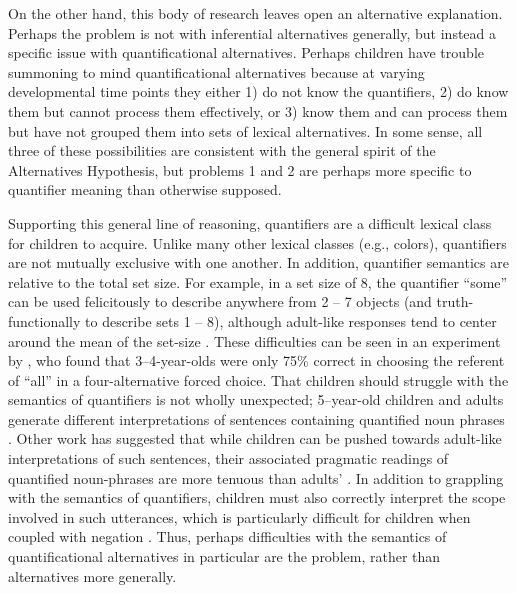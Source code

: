 \documentclass[man]{apa2}
\begin{document}
On the other hand, this body of research leaves open an alternative explanation. Perhaps the problem is not with inferential alternatives generally, but instead a specific issue with quantificational alternatives. Perhaps children have trouble summoning to mind quantificational alternatives because at varying developmental time points they either 1) do not know the quantifiers, 2) do know them but cannot process them effectively, or 3) know them and can process them but have not grouped them into sets of lexical alternatives. In some sense, all three of these possibilities are consistent with the general spirit of the Alternatives Hypothesis, but problems 1 and 2 are perhaps more specific to quantifier meaning than otherwise supposed. 

Supporting this general line of reasoning, quantifiers are a difficult lexical class for children to acquire. Unlike many other lexical classes (e.g., colors), quantifiers are not mutually exclusive with one another. In addition, quantifier semantics are relative to the total set size. For example, in a set size of 8, the quantifier ``some'' can be used felicitously to describe anywhere from 2 -- 7 objects  (and truth-functionally to describe sets 1 -- 8), although adult-like responses tend to center around the mean of the set-size . These difficulties can be seen in an experiment by , who found that 3--4-year-olds were only 75\% correct in choosing the referent of ``all'' in a four-alternative forced choice. That children should struggle with the semantics of quantifiers is not wholly unexpected; 5--year-old children and adults generate different interpretations of sentences containing quantified noun phrases \cite{musolino1998}. Other work has suggested that while children can be pushed towards adult-like interpretations of such sentences, their associated pragmatic readings of quantified noun-phrases are more tenuous than adults' \cite{musolino2006}. In addition to grappling with the semantics of quantifiers, children  must also correctly interpret the scope involved in such utterances, which is particularly difficult for children when coupled with negation \cite{moscati2014,musolino1998,musolino2006,zhou2009}. Thus, perhaps difficulties with the semantics of quantificational alternatives in particular are the problem, rather than alternatives more generally.
%
%
%
%
\end{document}
